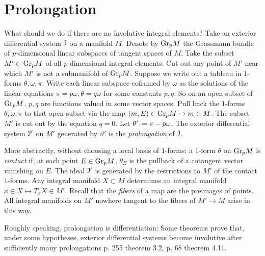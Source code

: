\section{Prolongation}
What should we do if there are no involutive integral elements?
Take an exterior differential system \(\mathcal{I}\) on a manifold \(M\).
Denote by \(\operatorname{Gr}_{p}\!M\) the Grassmann bundle of \(p\)-dimensional linear subspaces of tangent spaces of \(M\).
Take the subset \(M' \subset \operatorname{Gr}_{p}\!M\) of all \(p\)-dimensional integral elements.
Cut out any point of \(M'\) near which \(M'\) is not a submanifold of \(\operatorname{Gr}_{p}\!M\).
Suppose we write out a tableau in \(1\)-forms \(\theta,\omega,\pi\).
Write each linear subspace coframed by \(\omega\) as the solutions of the linear equations \(\pi=p\omega,\theta=q\omega\) for some constants \(p,q\).
So on an open subset of \(\operatorname{Gr}_{p}\!M\), \(p,q\) are functions valued in some vector spaces.
Pull back the \(1\)-forms \(\theta, \omega, \pi\) to that open subset via the map  \((m,E) \in \operatorname{Gr}_{p}\!M \mapsto m \in M\).
The subset \(M'\) is cut out by the equation \(q=0\).
Let \(\theta'\defeq \pi-p\omega\).
The exterior differential system \(\mathcal{I}'\) on \(M'\) generated by \(\vartheta'\) is the \emph{prolongation} of \(\mathcal{I}\).

More abstractly, without choosing a local basis of \(1\)-forms: a \(1\)-form \(\theta\) on \(\operatorname{Gr}_{p}\!M\) is \emph{contact} if, at each point \(E\in\operatorname{Gr}_{p}\!M\),  \(\theta_E\) is the pullback of a cotangent vector vanishing on \(E\).
The ideal \(\mathcal{I}'\) is generated by the restrictions to \(M'\) of the contact \(1\)-forms.
Any integral manifold \(X \subset M\) determines an integral manifold \(x \in X \mapsto T_x X \in M'\).
Recall that the \emph{fibers} of a map are the preimages of points.
All integral manifolds on \(M'\) nowhere tangent to the fibers of \(M' \to M\) arise in this way.

Roughly speaking, prolongation is differentiation:
Some theorems prove that, under some hypotheses, exterior differential systems become involutive after sufficiently many prolongations \cite{BCGGG:1991} p. 255 theorem 3.2, \cite{Malgrange:2005} p. 68 theorem 4.11.

